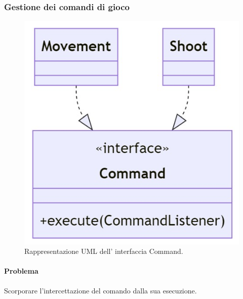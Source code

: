 \documentclass[a4paper,12pt]{report}
\begin{document}
\subsubsection*{Gestione dei comandi di gioco}
%
\begin{figure}[H]
	\centering{}
	\includegraphics[scale=0.4]{img/command.jpg}
	\caption{Rappresentazione UML dell' interfaccia Command.}
	\label{img:strategy}
	\end{figure}
%	
\paragraph*{Problema} Scorporare l'intercettazione del comando dalla sua esecuzione.
%
\end{document}

